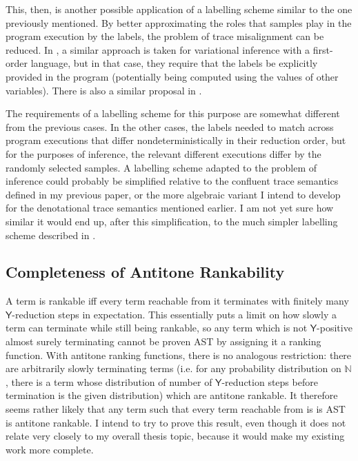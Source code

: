 \documentclass[titlepage]{article}
\newcommand{\tY}{\mathsf{Y}}
\begin{document}
This, then, is another possible application of a labelling scheme similar to the one previously mentioned. By better approximating the roles that samples play in the program execution by the labels, the problem of trace misalignment can be reduced. In \cite{lee2019towards}, a similar approach is taken for variational inference with a first-order language, but in that case, they require that the labels be explicitly provided in the program (potentially being computed using the values of other variables). There is also a similar proposal in \cite{pmlr-v15-wingate11a}.

The requirements of a labelling scheme for this purpose are somewhat different from the previous cases. In the other cases, the labels needed to match across program executions that differ nondeterministically in their reduction order, but for the purposes of inference, the relevant different executions differ by the randomly selected samples. A labelling scheme adapted to the problem of inference could probably be simplified relative to the confluent trace semantics defined in my previous paper, or the more algebraic variant I intend to develop for the denotational trace semantics mentioned earlier. I am not yet sure how similar it would end up, after this simplification, to the much simpler labelling scheme described in \cite{pmlr-v15-wingate11a}.

\subsection{Completeness of Antitone Rankability}
A term is rankable iff every term reachable from it terminates with finitely many $\tY$-reduction steps in expectation. This essentially puts a limit on how slowly a term can terminate while still being rankable, so any term which is not $\tY$-positive almost surely terminating cannot be proven AST by assigning it a ranking function. With antitone ranking functions, there is no analogous restriction: there are arbitrarily slowly terminating terms (i.e. for any probability distribution on $\mathbb N$, there is a term whose distribution of number of $\tY$-reduction steps before termination is the given distribution) which are antitone rankable. It therefore seems rather likely that any term such that every term reachable from is is AST is antitone rankable. I intend to try to prove this result, even though it does not relate very closely to my overall thesis topic, because it would make my existing work more complete.


\end{document}
